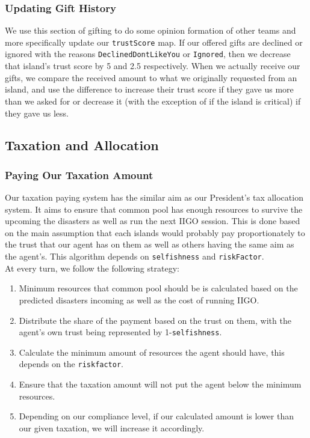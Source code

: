 \documentclass{article}
\begin{document}
\subsubsection{Updating Gift History}
We use this section of gifting to do some opinion formation of other teams and more specifically update our \texttt{trustScore} map. If our offered gifts are declined or ignored with the reasons \texttt{DeclinedDontLikeYou} or \texttt{Ignored}, then we decrease that island's trust score by 5 and 2.5 respectively. When we actually receive our gifts, we compare the received amount to what we originally requested from an island, and use the difference to increase their trust score if they gave us more than we asked for or decrease it (with the exception of if the island is critical) if they gave us less.

\subsection{Taxation and Allocation}
\subsubsection*{Paying Our Taxation Amount}
Our taxation paying system has the similar aim as our President's tax allocation system. It aims to ensure that common pool has enough resources to survive the upcoming the disasters as well as run the next IIGO session. This is done based on the main assumption that each islands would probably pay proportionately to the trust that our agent has on them as well as others having the same aim as the agent's. This algorithm depends on \texttt{selfishness} and \texttt{riskFactor}.\\

At every turn, we follow the following strategy:

\begin{enumerate}
    \item Minimum resources that common pool should be is calculated based on the predicted disasters incoming as well as the cost of running IIGO.
    \item Distribute the share of the payment based on the trust on them, with the agent's own trust being represented by 1-\texttt{selfishness}.
    \item Calculate the minimum amount of resources the agent should have, this depends on the \texttt{riskfactor}. 
    \item Ensure that the taxation amount will not put the agent below the minimum resources. 
    \item Depending on our compliance level, if our calculated amount is lower than our given taxation, we will increase it accordingly.
\end{enumerate}
\end{document}

